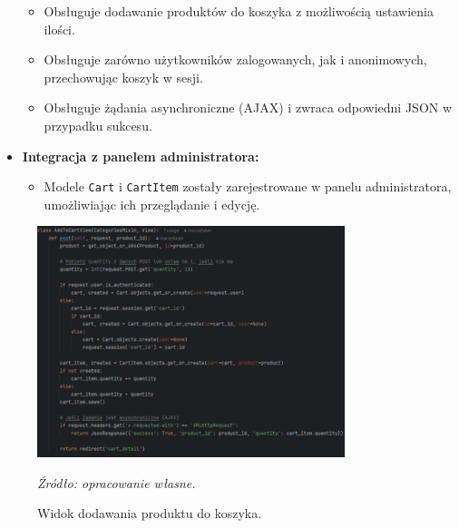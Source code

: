 \documentclass[12pt,a4paper,oneside]{article}
\theoremstyle{definition}
\numberwithin{equation}{section}
\begin{document}
\begin{itemize}
    \begin{itemize}
        \item Obsługuje dodawanie produktów do koszyka z możliwością ustawienia ilości.
        \item Obsługuje zarówno użytkowników zalogowanych, jak i anonimowych,\\ przechowując koszyk w sesji.
        \item Obsługuje żądania asynchroniczne (AJAX) i zwraca odpowiedni JSON w przypadku sukcesu.
    \end{itemize}
    \item \textbf{Integracja z panelem administratora:}
    \begin{itemize}
        \item Modele \texttt{Cart} i \texttt{CartItem} zostały zarejestrowane w panelu administratora, umożliwiając ich przeglądanie i edycję.
    \end{itemize}
\end{itemize}
\begin{figure}[H]
    \centering
    \includegraphics[width=0.8\textwidth]{images/krzysztofBImages/add_to_cart_view.png}
    \caption{Widok dodawania produktu do koszyka.}
    \emph{Źródło: opracowanie własne.}
    \label{fig:add_to_cart}
\end{figure}
%
%
\end{document}
